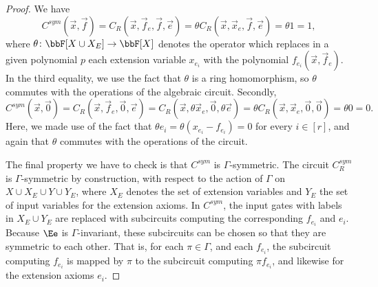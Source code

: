 \documentclass[a4paper,UKenglish,cleveref, autoref, thm-restate]{lipics-v2021}
\begin{document}
\begin{proof}
	We have
	\[
	C^{sym}(\vec x, \vec f) = C_R(\vec x, \vec f_e, \vec f, \vec e) = \theta C_R(\vec x, \vec x_e, \vec f, \vec e) = \theta 1 = 1,
	\]
	where $\theta \colon \bbF[X \cup X_E] \to \bbF[X]$ denotes the operator which replaces in a given polynomial $p$ each extension variable $x_{e_i}$ with the polynomial $f_{e_i}(\vec x, \vec f_e)$. In the third equality, we use the fact that $\theta$ is a ring homomorphism, so $\theta$ commutes with the operations of the algebraic circuit. Secondly, 
	\[
	C^{sym}(\vec x, \vec 0) =  C_R(\vec x, \vec f_e, \vec 0, \vec e) = C_R(\vec x, \theta \vec x_e, \vec 0, \theta \vec e) = \theta C_R(\vec x, \vec x_e, \vec 0, \vec 0)  = \theta 0 = 0.
	\]
	Here, we made use of the fact that $\theta e_i = \theta(x_{e_i} - f_{e_i}) = 0$ for every $i \in [r]$, and again that $\theta$ commutes with the operations of the circuit.
	
	The final property we have to check is that $C^{sym}$ is $\Gamma$-symmetric. The circuit $C^{sym}_R$ is $\Gamma$-symmetric by construction, with respect to the action of $\Gamma$ on $X \cup X_E \cup Y \cup Y_E$, where $X_E$ denotes the set of extension variables and $Y_E$ the set of input variables for the extension axioms. In $C^{sym}$, the input gates with labels in $X_E \cup Y_E$ are replaced with subcircuits computing the corresponding $f_{e_i}$ and $e_i$. Because $\Ee$ is $\Gamma$-invariant, these subcircuits can be chosen so that they are symmetric to each other. That is, for each $\pi \in \Gamma$, and each $f_{e_i}$, the subcircuit computing $f_{e_i}$ is mapped by $\pi$ to the subcircuit computing $\pi f_{e_i}$, and likewise for the extension axioms $e_i$. 
\end{proof}	
\end{document}

